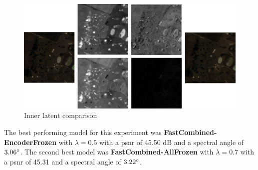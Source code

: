 \begin{figure}
\centering
\includegraphics[scale=0.85]{img/innerlatent.png}
\caption{Inner latent comparison}
\label{fig:innerlatent}
\end{figure}

The best performing model for this experiment was \textbf{FastCombined-EncoderFrozen} with $\lambda=0.5$ with a \ac{psnr} of 45.50 dB and a spectral angle of $3.06 \degree$. The second best model was \textbf{FastCombined-AllFrozen} with $\lambda=0.7$ with a \ac{psnr} of 45.31 and a spectral angle of $3.22 \degree$.

